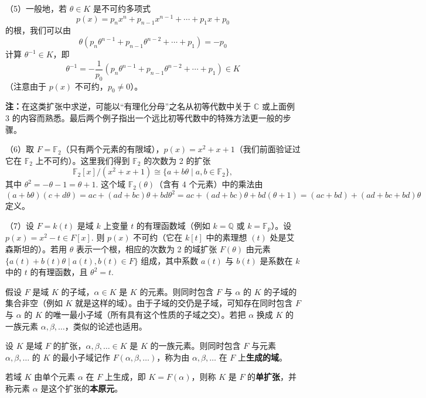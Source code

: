 \begin{example}
（5）一般地，若 \(\theta \in K\) 是不可约多项式
\[
p(x) = p_nx^n+p_{n-1}x^{n-1}+\cdots+p_1x+p_0
\]
的根，我们可以由
\[
\theta(p_n\theta^{n-1}+p_{n-1}\theta^{n-2}+\cdots+p_1) = -p_0
\]
计算 \(\theta^{-1} \in K\)，即
\[
\theta^{-1} = -\frac{1}{p_0}(p_n\theta^{n-1}+p_{n-1}\theta^{n-2}+\cdots+p_1) \in K
\]
（注意由于 \(p(x)\) 不可约，\(p_0 \neq 0\)）。

\noindent\textbf{注：}在这类扩张中求逆，可能以“有理化分母”之名从初等代数中关于 \(\mathbb{C}\) 或上面例 3 的内容而熟悉。最后两个例子指出一个远比初等代数中的特殊方法更一般的步骤。

（6）取 \(F = \mathbb{F}_2\)（只有两个元素的有限域），\(p(x) = x^2+x+1\)（我们前面验证过它在 \(\mathbb{F}_2\) 上不可约）。这里我们得到 \(\mathbb{F}_2\) 的次数为 2 的扩张
\[
\mathbb{F}_2[x]/(x^2+x+1) \cong \{a+b\theta \mid a, b \in \mathbb{F}_2\},
\]
其中 \(\theta^2 = -\theta-1 = \theta+1\). 这个域 \(\mathbb{F}_2(\theta)\)（含有 4 个元素）中的乘法由
\[
(a+b\theta)(c+d\theta) = ac+(ad+bc)\theta+bd\theta^2 = ac+(ad+bc)\theta+bd(\theta+1) = (ac+bd)+(ad+bc+bd)\theta
\]
定义。

（7）设 \(F = k(t)\) 是域 \(k\) 上变量 \(t\) 的有理函数域（例如 \(k = \mathbb{Q}\) 或 \(k = \mathbb{F}_p\)）。设 \(p(x) = x^2-t \in F[x]\). 则 \(p(x)\) 不可约（它在 \(k[t]\) 中的素理想 \((t)\) 处是艾森斯坦的）。若用 \(\theta\) 表示一个根，相应的次数为 2 的域扩张 \(F(\theta)\) 由元素 \(\{a(t)+b(t)\theta \mid a(t), b(t) \in F\}\) 组成，其中系数 \(a(t)\) 与 \(b(t)\) 是系数在 \(k\) 中的 \(t\) 的有理函数，且 \(\theta^2 = t\).
\end{example}

假设 \(F\) 是域 \(K\) 的子域，\(\alpha \in K\) 是 \(K\) 的元素。则同时包含 \(F\) 与 \(\alpha\) 的 \(K\) 的子域的集合非空（例如 \(K\) 就是这样的域）。由于子域的交仍是子域，可知存在同时包含 \(F\) 与 \(\alpha\) 的 \(K\) 的唯一最小子域（所有具有这个性质的子域之交）。若把 \(\alpha\) 换成 \(K\) 的一族元素 \(\alpha, \beta, \ldots\)，类似的论述也适用。

\begin{definition}
设 \(K\) 是域 \(F\) 的扩张，\(\alpha, \beta, \ldots \in K\) 是 \(K\) 的一族元素。则同时包含 \(F\) 与元素 \(\alpha, \beta, \ldots\) 的 \(K\) 的最小子域记作 \(F(\alpha, \beta, \ldots)\)，称为由 \(\alpha, \beta, \ldots\) 在 \(F\) 上\textbf{生成的域}。
\end{definition}

\begin{definition}
若域 \(K\) 由单个元素 \(\alpha\) 在 \(F\) 上生成，即 \(K = F(\alpha)\)，则称 \(K\) 是 \(F\) 的\textbf{单扩张}，并称元素 \(\alpha\) 是这个扩张的\textbf{本原元}。
\end{definition}

